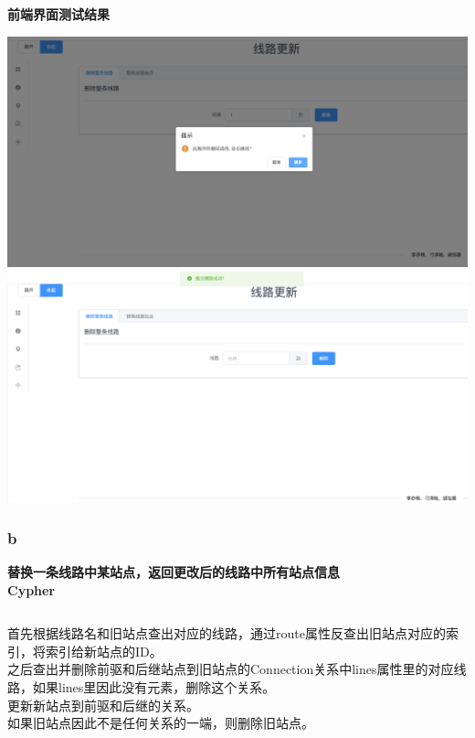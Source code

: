 \documentclass[11pt,a4paper]{article}
\begin{document}
\textbf{前端界面测试结果} \\
\begin{center}
\centering
\includegraphics[scale=0.3]{./assets/demand20_1.png} \\ 
\includegraphics[scale=0.3]{./assets/demand20_2.png} 
\end{center}

\subsubsection{b}
\textbf{替换一条线路中某站点，返回更改后的线路中所有站点信息} \\
\textbf{Cypher} \\
\begin{lstlisting}[numbers = left, 
showstringspaces=false,
showspaces = false,
breaklines = true, 
language=Java]

\end{lstlisting} 
首先根据线路名和旧站点查出对应的线路，通过route属性反查出旧站点对应的索引，将索引给新站点的ID。\\
之后查出并删除前驱和后继站点到旧站点的Connection关系中lines属性里的对应线路，如果lines里因此没有元素，删除这个关系。\\
更新新站点到前驱和后继的关系。\\
如果旧站点因此不是任何关系的一端，则删除旧站点。
\end{document}
